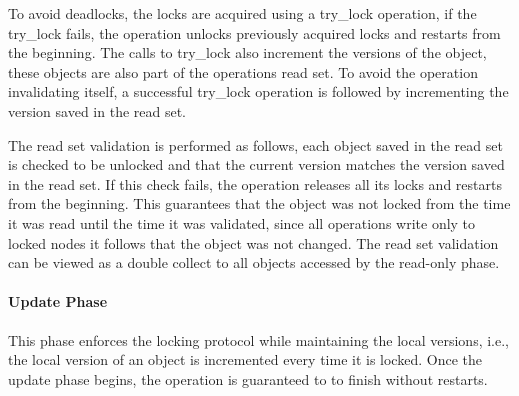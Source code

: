 To avoid deadlocks, the locks are acquired using a try\_lock
operation, if the try\_lock fails, the operation unlocks 
previously acquired locks and restarts from the beginning. 
The calls to try\_lock also increment the versions 
of the object,  these objects are also part of the 
operations read set. 
To avoid the operation invalidating itself, 
a successful try\_lock operation is followed by incrementing
the version saved in the read set.  

The read set validation is performed as follows, 
each object saved in the read set is checked to be unlocked 
and that the current version matches the version saved in the 
read set. If this check fails, the operation releases all its
locks and restarts from the beginning. This guarantees that
the object was not locked from the time it was read until
the time it was validated, since all operations write only to
locked nodes it follows that the object was not changed.  
The read set validation can be viewed as a double collect 
to all objects accessed by the read-only phase. 


  
\paragraph{Update Phase} 
This phase enforces the locking protocol
  while maintaining the local versions, i.e., the local version of 
  an object is incremented every time it is locked.  
  Once the update phase begins, the operation is guaranteed to to 
  finish without restarts.  


